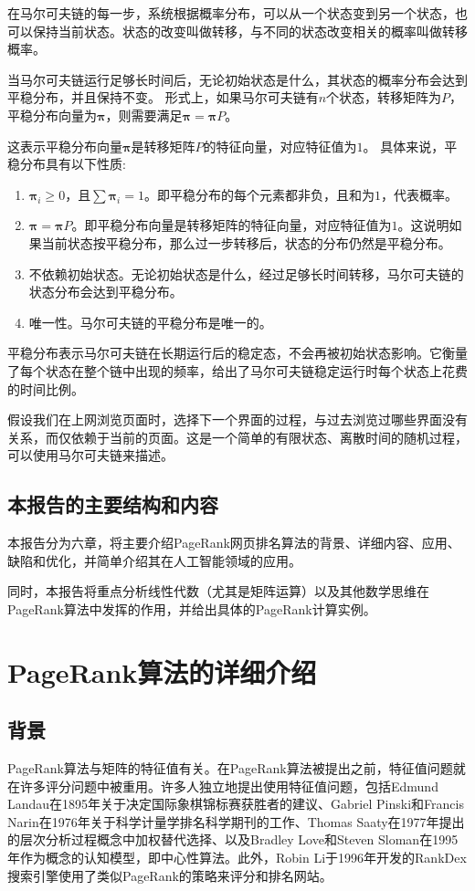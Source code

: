 \documentclass[UTF8,openany]{ctexbook}
\begin{document}
在马尔可夫链的每一步，系统根据概率分布，可以从一个状态变到另一个状态，也可以保持当前状态。状态的改变叫做转移，与不同的状态改变相关的概率叫做转移概率。

当马尔可夫链运行足够长时间后，无论初始状态是什么，其状态的概率分布会达到平稳分布，并且保持不变。
形式上，如果马尔可夫链有$n$个状态，转移矩阵为$P$，平稳分布向量为$\boldsymbol{\pi}$，则需要满足$\boldsymbol{\pi} = \boldsymbol{\pi} P$。


这表示平稳分布向量$\boldsymbol{\pi}$是转移矩阵$P$的特征向量，对应特征值为$1$。
具体来说，平稳分布具有以下性质:

\begin{enumerate}
    \item $\boldsymbol{\pi}_i \ge 0$，且$\sum\boldsymbol{\pi}_i = 1$。即平稳分布的每个元素都非负，且和为$1$，代表概率。
    \item $\boldsymbol{\pi}=\boldsymbol\pi P$。即平稳分布向量是转移矩阵的特征向量，对应特征值为$1$。这说明如果当前状态按平稳分布，那么过一步转移后，状态的分布仍然是平稳分布。
    \item 不依赖初始状态。无论初始状态是什么，经过足够长时间转移，马尔可夫链的状态分布会达到平稳分布。
    \item 唯一性。马尔可夫链的平稳分布是唯一的。
\end{enumerate}

平稳分布表示马尔可夫链在长期运行后的稳定态，不会再被初始状态影响。它衡量了每个状态在整个链中出现的频率，给出了马尔可夫链稳定运行时每个状态上花费的时间比例。

假设我们在上网浏览页面时，选择下一个界面的过程，与过去浏览过哪些界面没有关系，而仅依赖于当前的页面。这是一个简单的有限状态、离散时间的随机过程，可以使用马尔可夫链来描述。

\section[本报告的主要结构和内容]{本报告的主要结构和内容}
本报告分为六章，将主要介绍PageRank网页排名算法的背景、详细内容、应用、缺陷和优化，并简单介绍其在人工智能领域的应用。

同时，本报告将重点分析线性代数（尤其是矩阵运算）以及其他数学思维在PageRank算法中发挥的作用，并给出具体的PageRank计算实例。


\chapter[PageRank算法的详细介绍]{PageRank算法的详细介绍}
\thispagestyle{fancy}
\section[背景]{背景}
PageRank算法与矩阵的特征值有关。在PageRank算法被提出之前，特征值问题就在许多评分问题中被重用。许多人独立地提出使用特征值问题，包括Edmund Landau在1895年关于决定国际象棋锦标赛获胜者的建议、Gabriel Pinski和Francis Narin在1976年关于科学计量学排名科学期刊的工作、Thomas Saaty在1977年提出的层次分析过程概念中加权替代选择、以及Bradley Love和Steven Sloman在1995年作为概念的认知模型，即中心性算法。此外，Robin Li于1996年开发的RankDex搜索引擎使用了类似PageRank的策略来评分和排名网站。
\end{document}
